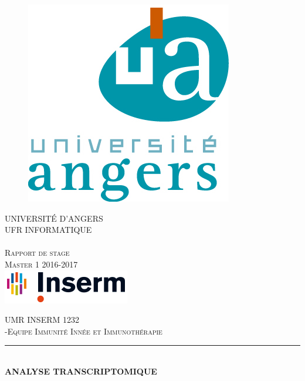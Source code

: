 \documentclass[a4paper,10pt]{article}
\newcommand{\HRule}{\rule{\linewidth}{0.5mm}}
\begin{document}
\begin{titlepage}
  \begin{sffamily}
  \begin{center}

    \begin{figure}
 \centering
 \includegraphics[scale=0.01]{./image/ua_v_couleur.jpg}
\end{figure}

    
    \textsc{ UNIVERSIT\'{E} D'ANGERS \\ UFR INFORMATIQUE}\\[0.5cm]
    \textsc{ \\ Rapport de stage \\ Master 1 2016-2017 }\\[1.5cm]
    
    \includegraphics{./image/logo-generique-SD.png}
    
    \textsc{UMR INSERM 1232 \\-Equipe Immunité Innée et Immunothérapie}\\[1cm]
     
    \HRule \\[0.4cm]
    { \huge \bfseries ANALYSE TRANSCRIPTOMIQUE\\[0.4cm] }


\end{center}
\end{sffamily}
\end{titlepage}
\end{document}
